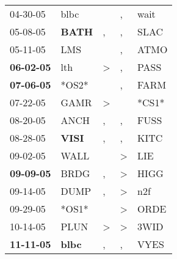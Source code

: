 \begin{supertabular}{p{0.07\textwidth}p{0.06\textwidth}p{0.02\textwidth}p{0.02\textwidth}p{0.06\textwidth}}
          04-30-05\textsuperscript{} &           blbc\textsuperscript{} &                  &                , &           wait\textsuperscript{} \\
          05-08-05\textsuperscript{} &  \textbf{BATH\textsuperscript{}} &                , &                , &           SLAC\textsuperscript{} \\
          05-11-05\textsuperscript{} &            LMS\textsuperscript{} &                  &                , &           ATMO\textsuperscript{} \\
 \textbf{06-02-05\textsuperscript{}} &            lth\textsuperscript{} &     \textgreater &                , &           PASS\textsuperscript{} \\
 \textbf{07-06-05\textsuperscript{}} &                            *OS2* &                  &                , &           FARM\textsuperscript{} \\
          07-22-05\textsuperscript{} &           GAMR\textsuperscript{} &     \textgreater &                  &                            *CS1* \\
          08-20-05\textsuperscript{} &           ANCH\textsuperscript{} &                , &                , &           FUSS\textsuperscript{} \\
          08-28-05\textsuperscript{} &  \textbf{VISI\textsuperscript{}} &                , &                , &           KITC\textsuperscript{} \\
          09-02-05\textsuperscript{} &           WALL\textsuperscript{} &                  &     \textgreater &            LIE\textsuperscript{} \\
 \textbf{09-09-05\textsuperscript{}} &           BRDG\textsuperscript{} &                , &     \textgreater &           HIGG\textsuperscript{} \\
          09-14-05\textsuperscript{} &           DUMP\textsuperscript{} &                , &     \textgreater &            n2f\textsuperscript{} \\
          09-29-05\textsuperscript{} &                            *OS1* &                  &     \textgreater &           ORDE\textsuperscript{} \\
          10-14-05\textsuperscript{} &           PLUN\textsuperscript{} &     \textgreater &     \textgreater &           3WID\textsuperscript{} \\
 \textbf{11-11-05\textsuperscript{}} &  \textbf{blbc\textsuperscript{}} &                , &                , &           VYES\textsuperscript{} \\

\end{supertabular}
